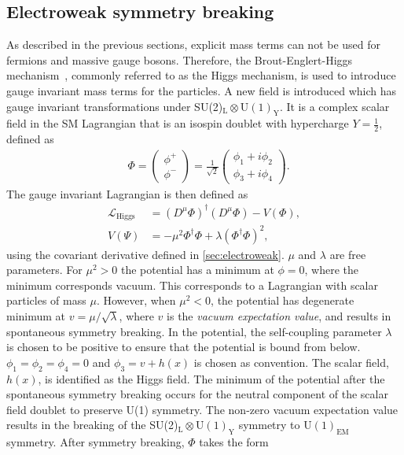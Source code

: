 \subsection{Electroweak symmetry breaking}\label{sec:symmbreak}
As described in the previous sections, explicit mass terms can not be used for fermions and massive gauge bosons. Therefore, the Brout-Englert-Higgs mechanism~\cite{Higgs1964,Englert1964}, commonly referred to as the Higgs mechanism, is used to introduce gauge invariant mass terms for the particles. A new field is introduced which has gauge invariant transformations under SU(2)$_\mathrm{L}\otimes\mathrm{U(1)}_\mathrm{Y}$. It is a complex scalar field in the SM Lagrangian that is an isospin doublet with hypercharge $Y = \frac{1}{2}$, defined as
\begin{equation}\renewcommand*{\arraystretch}{\newarraystrech}
    \label{eq:scalarfield}
    \begin{aligned}
        & \Phi = 
        \begin{pmatrix}
            \phi^+ \\
            \phi^- 
        \end{pmatrix} =
        \frac{1}{\sqrt{2}} 
        \begin{pmatrix}
            \phi_1 + i\phi_2 \\
            \phi_3 + i\phi_4
        \end{pmatrix}.
     \end{aligned}
\end{equation}
The gauge invariant Lagrangian is then defined as
\begin{equation}
    \label{eq:lagrangianhiggs}
    \begin{aligned}
        \mathcal{L}_\mathrm{Higgs} &= (D^\mu\Phi)^\dagger(D^\mu\Phi) - V(\Phi), \\
        V(\Psi) &= - \mu^2\Phi^\dagger\Phi + \lambda(\Phi^\dagger\Phi)^2,
     \end{aligned}
\end{equation}
using the covariant derivative defined in \cref{sec:electroweak}. $\mu$ and $\lambda$ are free parameters. For $\mu^2 > 0$ the potential has a minimum at $\phi = 0$, where the minimum corresponds vacuum. This corresponds to a Lagrangian with scalar particles of mass $\mu$. However, when $\mu^2 < 0$, the potential has degenerate minimum at $v = \mu/\sqrt{\lambda}$, where $v$ is the \emph{vacuum expectation value}, and results in spontaneous symmetry breaking. In the potential, the self-coupling parameter $\lambda$ is chosen to be positive to ensure that the potential is bound from below.  $\phi_1 = \phi_2 = \phi_4 = 0$ and $\phi_3 = v + h(x)$ is chosen as convention. The scalar field, $h(x)$, is identified as the Higgs field. The minimum of the potential after the spontaneous symmetry breaking occurs for the neutral component of the scalar field doublet to preserve U(1) symmetry. The non-zero vacuum expectation value results in the breaking of the SU(2)$_\mathrm{L}\otimes\mathrm{U(1)}_\mathrm{Y}$ symmetry to $\mathrm{U(1)}_\mathrm{EM}$ symmetry. After symmetry breaking, $\Phi$ takes the form 
